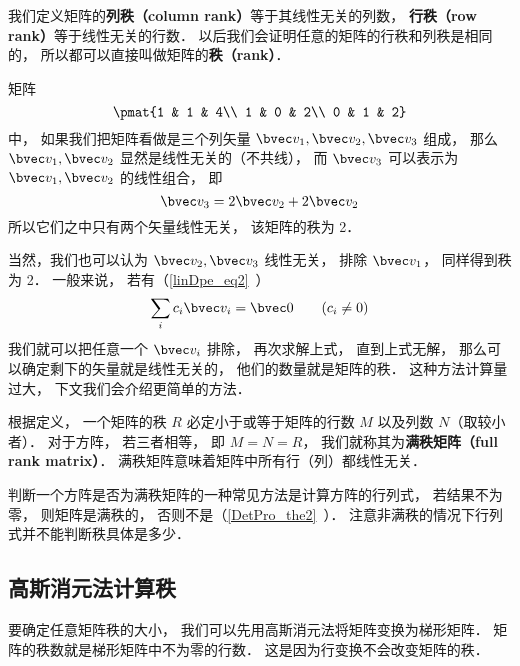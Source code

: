 

我们定义矩阵的\textbf{列秩（column rank）}等于其线性无关的列数， \textbf{行秩（row rank）}等于线性无关的行数． 以后我们会证明任意的矩阵的行秩和列秩是相同的， 所以都可以直接叫做矩阵的\textbf{秩（rank）}．

\begin{example}{}
矩阵
\begin{equation}\label{MatRnk_eq1}
\pmat{1 & 1 & 4\\ 1 & 0 & 2\\ 0 & 1 & 2}
\end{equation}
中， 如果我们把矩阵看做是三个列矢量 $\bvec v_1, \bvec v_2, \bvec v_3$ 组成， 那么 $\bvec v_1, \bvec v_2$ 显然是线性无关的（不共线）， 而 $\bvec v_3$ 可以表示为 $\bvec v_1, \bvec v_2$ 的线性组合， 即
\begin{equation}
\bvec v_3 = 2\bvec v_2 + 2\bvec v_2
\end{equation}
所以它们之中只有两个矢量线性无关， 该矩阵的秩为 2．

当然，我们也可以认为 $\bvec v_2, \bvec v_3$ 线性无关， 排除 $\bvec v_1$， 同样得到秩为 2． 一般来说， 若有（\autoref{linDpe_eq2}~）
\begin{equation}
\sum_i c_i \bvec v_i = \bvec 0 \qquad (c_i \ne 0)
\end{equation}
我们就可以把任意一个 $\bvec v_i$ 排除， 再次求解上式， 直到上式无解， 那么可以确定剩下的矢量就是线性无关的， 他们的数量就是矩阵的秩． 这种方法计算量过大， 下文我们会介绍更简单的方法．
\end{example}

根据定义， 一个矩阵的秩 $R$ 必定小于或等于矩阵的行数 $M$ 以及列数 $N$（取较小者）． 对于方阵， 若三者相等， 即 $M = N = R$， 我们就称其为\textbf{满秩矩阵（full rank matrix）}． 满秩矩阵意味着矩阵中所有行（列）都线性无关．

判断一个方阵是否为满秩矩阵的一种常见方法是计算方阵的行列式， 若结果不为零， 则矩阵是满秩的， 否则不是（\autoref{DetPro_the2}~）． 注意非满秩的情况下行列式并不能判断秩具体是多少．

\subsection{高斯消元法计算秩}
要确定任意矩阵秩的大小， 我们可以先用高斯消元法将矩阵变换为梯形矩阵． 矩阵的秩数就是梯形矩阵中不为零的行数． 这是因为行变换不会改变矩阵的秩．

